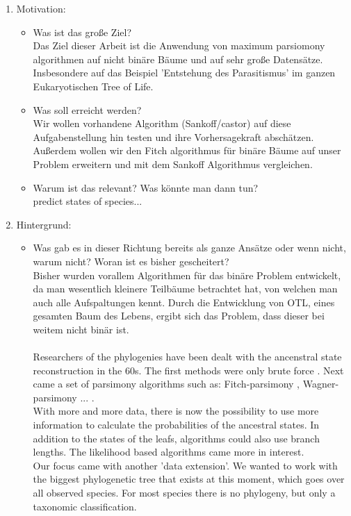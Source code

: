   \begin{enumerate}
    \item Motivation:
      \begin{itemize}
        \item Was ist das große Ziel? \\
          Das Ziel dieser Arbeit ist die Anwendung von maximum parsiomony algorithmen auf nicht 
          binäre Bäume und auf sehr große Datensätze. Insbesondere auf das Beispiel 'Entstehung des 
          Parasitismus' im ganzen Eukaryotischen Tree of Life.
        \item Was soll erreicht werden? \\
          Wir wollen vorhandene Algorithm (Sankoff/castor) auf diese Aufgabenstellung hin testen 
          und ihre Vorhersagekraft abschätzen. Außerdem wollen wir den Fitch algorithmus für binäre 
          Bäume auf unser Problem erweitern und mit dem Sankoff Algorithmus vergleichen.
        \item Warum ist das relevant? Was könnte man dann tun?\\
          predict states of species... \\
          \todo{!!!}
      \end{itemize}
    \item Hintergrund:
      \begin{itemize}
        \item Was gab es in dieser Richtung bereits als ganze Ansätze oder wenn nicht, warum nicht?
          Woran ist es bisher gescheitert? \\
          Bisher wurden vorallem Algorithmen für das binäre Problem entwickelt, da man wesentlich 
            kleinere Teilbäume betrachtet hat, von welchen man auch alle Aufspaltungen kennt. Durch 
            die Entwicklung von OTL, eines gesamten Baum des Lebens, ergibt sich das Problem, dass 
            dieser bei weitem nicht binär ist. \\ \\
  Researchers of the phylogenies have been dealt with the ancenstral state reconstruction in the 
    60s. The first methods were only brute force . 
    Next came a set of parsimony algorithms such as: Fitch-parsimony \cite{Fitch1971}, 
    Wagner-parsimony \cite{Swofford1987} ... . \\
    With more and more data, there is now the possibility to use more information to calculate the 
    probabilities of the ancestral states. In addition to the states of the leafs, algorithms could 
    also use branch lengths. The likelihood based algorithms came more in interest. \\
    Our focus came with another 'data extension'. We wanted to work with the biggest phylogenetic tree 
    that exists at this moment, which goes over all observed species. For most  species 
    there is no phylogeny, but only a taxonomic classification.
  

\end{itemize}
\end{enumerate}
